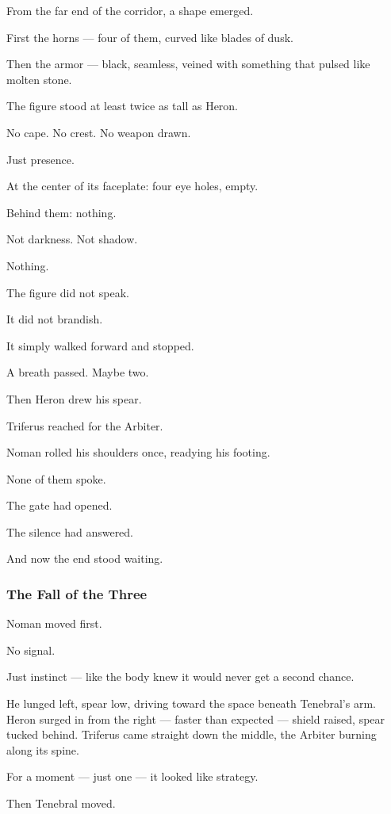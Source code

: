 \documentclass[12pt]{article}
\begin{document}
From the far end of the corridor, a shape emerged.

First the horns — four of them, curved like blades of dusk.

Then the armor — black, seamless, veined with something that pulsed like molten stone.

The figure stood at least twice as tall as Heron.

No cape. No crest. No weapon drawn.

Just presence.

At the center of its faceplate: four eye holes, empty.

Behind them: nothing.

Not darkness. Not shadow.

Nothing.

\bigskip

The figure did not speak.

It did not brandish.

It simply walked forward and stopped.

A breath passed. Maybe two.

Then Heron drew his spear.

Triferus reached for the Arbiter.

Noman rolled his shoulders once, readying his footing.

None of them spoke.

The gate had opened.

The silence had answered.

And now the end stood waiting.

\dotfill

\subsubsection*{The Fall of the Three}

Noman moved first.

No signal.

Just instinct — like the body knew it would never get a second chance.

He lunged left, spear low, driving toward the space beneath Tenebral’s arm. Heron surged in from the right — faster than expected — shield raised, spear tucked behind. Triferus came straight down the middle, the Arbiter burning along its spine.

For a moment — just one — it looked like strategy.

Then Tenebral moved.
\end{document}
